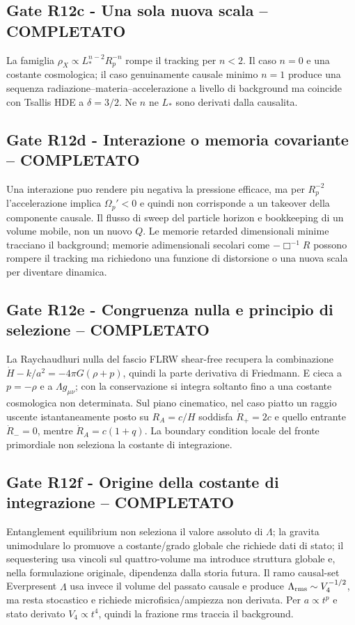 \documentclass[11pt,a4paper]{article}
\begin{document}
\subsection*{Gate R12c - Una sola nuova scala -- COMPLETATO}
La famiglia $\rho_X\propto L_*^{n-2}R_p^{-n}$ rompe il tracking per $n<2$. Il caso $n=0$ e una costante cosmologica; il caso genuinamente causale minimo $n=1$ produce una sequenza radiazione--materia--accelerazione a livello di background ma coincide con Tsallis HDE a $\delta=3/2$. Ne $n$ ne $L_*$ sono derivati dalla causalita.

\subsection*{Gate R12d - Interazione o memoria covariante -- COMPLETATO}
Una interazione puo rendere piu negativa la pressione efficace, ma per $R_p^{-2}$ l'accelerazione implica $\Omega_p'<0$ e quindi non corrisponde a un takeover della componente causale. Il flusso di sweep del particle horizon e bookkeeping di un volume mobile, non un nuovo $Q$. Le memorie retarded dimensionali minime tracciano il background; memorie adimensionali secolari come $-\Box^{-1}R$ possono rompere il tracking ma richiedono una funzione di distorsione o una nuova scala per diventare dinamica.

\subsection*{Gate R12e - Congruenza nulla e principio di selezione -- COMPLETATO}
La Raychaudhuri nulla del fascio FLRW shear-free recupera la combinazione $\dot H-k/a^2=-4\pi G(\rho+p)$, quindi la parte derivativa di Friedmann. E cieca a $p=-\rho$ e a $\Lambda g_{\mu\nu}$; con la conservazione si integra soltanto fino a una costante cosmologica non determinata. Sul piano cinematico, nel caso piatto un raggio uscente istantaneamente posto su $R_A=c/H$ soddisfa $\dot R_+=2c$ e quello entrante $\dot R_-=0$, mentre $\dot R_A=c(1+q)$. La boundary condition locale del fronte primordiale non seleziona la costante di integrazione.

\subsection*{Gate R12f - Origine della costante di integrazione -- COMPLETATO}
Entanglement equilibrium non seleziona il valore assoluto di $\Lambda$; la gravita unimodulare lo promuove a costante/grado globale che richiede dati di stato; il sequestering usa vincoli sul quattro-volume ma introduce struttura globale e, nella formulazione originale, dipendenza dalla storia futura. Il ramo causal-set Everpresent $\Lambda$ usa invece il volume del passato causale e produce $\Lambda_{\rm rms}\sim V_4^{-1/2}$, ma resta stocastico e richiede microfisica/ampiezza non derivata. Per $a\propto t^p$ e stato derivato $V_4\propto t^4$, quindi la frazione rms traccia il background.
\end{document}
